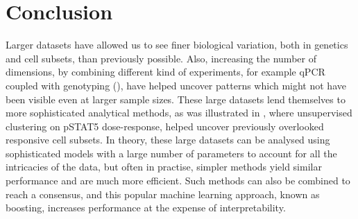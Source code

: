 


\section{Conclusion}


Larger datasets have allowed us to see finer biological variation, both in genetics and cell subsets, than previously possible.
Also, increasing the number of dimensions, by combining different kind of experiments, for example qPCR coupled with genotyping (), have helped uncover patterns which might not have been visible even at larger sample sizes.
These large datasets lend themselves to more sophisticated analytical methods, as was illustrated in , where unsupervised clustering on pSTAT5 dose-response, helped uncover previously overlooked responsive cell subsets.
In theory, these large datasets can be analysed using sophisticated models with a large number of parameters to account for all the intricacies of the data, but often in practise, simpler methods yield similar performance and are much more efficient.
Such methods can also be combined to reach a consensus, and this popular machine learning approach, known as boosting, increases performance at the expense of interpretability.

